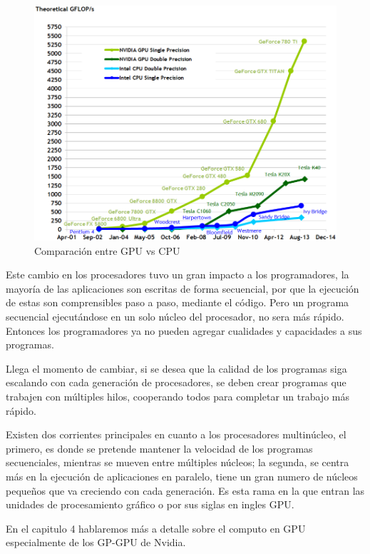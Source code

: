 \begin{figure}[ph]
			\centering
				\includegraphics[scale=0.7]{img/flops.png}
			\caption{Comparación entre GPU vs CPU \cite{Flops} }
\end{figure}

Este cambio en los procesadores tuvo un gran impacto a los programadores, la mayoría de las aplicaciones son escritas de forma secuencial,  por que la ejecución de estas son comprensibles paso a paso, mediante el código. Pero un programa secuencial ejecutándose en un solo núcleo del procesador, no sera más rápido. Entonces los programadores ya no pueden agregar cualidades y capacidades a sus programas.


Llega el momento de cambiar, si se desea que la calidad de los programas siga escalando con cada generación de procesadores, se deben crear programas que trabajen con múltiples hilos, cooperando todos para completar un trabajo más rápido. 

Existen dos corrientes principales en cuanto a los procesadores multinúcleo, el primero, es donde se pretende mantener la velocidad de los programas secuenciales, mientras se mueven entre múltiples núcleos; la segunda, se centra más en la ejecución de aplicaciones en paralelo, tiene un gran numero de núcleos pequeños que va creciendo con cada generación. Es esta rama en la que entran las unidades de procesamiento gráfico o por sus siglas en ingles GPU.\cite{Kirk2010} 

En el capitulo 4 hablaremos más a detalle sobre el computo en GPU especialmente de los GP-GPU de Nvidia.


